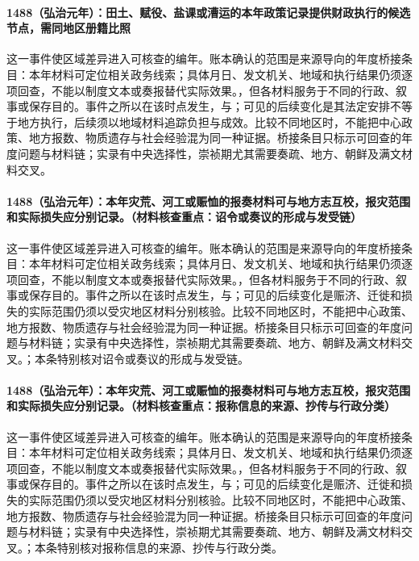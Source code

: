 \paragraph{1488（弘治元年）：田土、赋役、盐课或漕运的本年政策记录提供财政执行的候选节点，需同地区册籍比照} 这一事件使区域差异进入可核查的编年。账本确认的范围是来源导向的年度桥接条目：本年材料可定位相关政务线索；具体月日、发文机关、地域和执行结果仍须逐项回查，不能以制度文本或奏报替代实际效果。，但各材料服务于不同的行政、叙事或保存目的。事件之所以在该时点发生，与；可见的后续变化是其法定安排不等于地方执行，后续须以地域材料追踪负担与成效。比较不同地区时，不能把中心政策、地方报数、物质遗存与社会经验混为同一种证据。桥接条目只标示可回查的年度问题与材料链；实录有中央选择性，崇祯期尤其需要奏疏、地方、朝鲜及满文材料交叉。

\paragraph{1488（弘治元年）：本年灾荒、河工或赈恤的报奏材料可与地方志互校，报灾范围和实际损失应分别记录。（材料核查重点：诏令或奏议的形成与发受链）} 这一事件使区域差异进入可核查的编年。账本确认的范围是来源导向的年度桥接条目：本年材料可定位相关政务线索；具体月日、发文机关、地域和执行结果仍须逐项回查，不能以制度文本或奏报替代实际效果。，但各材料服务于不同的行政、叙事或保存目的。事件之所以在该时点发生，与；可见的后续变化是赈济、迁徙和损失的实际范围仍须以受灾地区材料分别核验。比较不同地区时，不能把中心政策、地方报数、物质遗存与社会经验混为同一种证据。桥接条目只标示可回查的年度问题与材料链；实录有中央选择性，崇祯期尤其需要奏疏、地方、朝鲜及满文材料交叉。；本条特别核对诏令或奏议的形成与发受链。

\paragraph{1488（弘治元年）：本年灾荒、河工或赈恤的报奏材料可与地方志互校，报灾范围和实际损失应分别记录。（材料核查重点：报称信息的来源、抄传与行政分类）} 这一事件使区域差异进入可核查的编年。账本确认的范围是来源导向的年度桥接条目：本年材料可定位相关政务线索；具体月日、发文机关、地域和执行结果仍须逐项回查，不能以制度文本或奏报替代实际效果。，但各材料服务于不同的行政、叙事或保存目的。事件之所以在该时点发生，与；可见的后续变化是赈济、迁徙和损失的实际范围仍须以受灾地区材料分别核验。比较不同地区时，不能把中心政策、地方报数、物质遗存与社会经验混为同一种证据。桥接条目只标示可回查的年度问题与材料链；实录有中央选择性，崇祯期尤其需要奏疏、地方、朝鲜及满文材料交叉。；本条特别核对报称信息的来源、抄传与行政分类。

